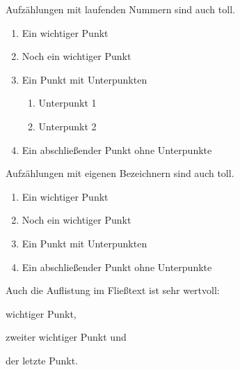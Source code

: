 Aufzählungen mit laufenden Nummern sind auch toll.

\begin{enumerate}
  \item Ein wichtiger Punkt
  \item Noch ein wichtiger Punkt
  \item Ein Punkt mit Unterpunkten
    \begin{enumerate}
      \item Unterpunkt 1
      \item Unterpunkt 2
    \end{enumerate}
  \item Ein abschließender Punkt ohne Unterpunkte
\end{enumerate}


Aufzählungen mit eigenen Bezeichnern sind auch toll.
\begin{enumerate}[label=RQ~\arabic*), leftmargin=1.75cm]
	\item Ein wichtiger Punkt
	\item Noch ein wichtiger Punkt
	\item Ein Punkt mit Unterpunkten
	\item Ein abschließender Punkt ohne Unterpunkte
\end{enumerate}


Auch die Auflistung im Fließtext ist sehr wertvoll: \begin{enumerate*}[label=\alph *)] \item wichtiger Punkt, \item zweiter wichtiger Punkt und \item der letzte Punkt. \end{enumerate*}


